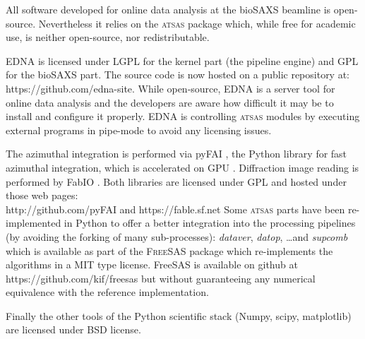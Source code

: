 \documentclass[preprint,pdf]{iucr}              %
\begin{document}
All software developed for online data analysis at the bioSAXS beamline is
open-source.
Nevertheless it relies on the \textsc{atsas} package which, while free for
academic use, is neither open-source, nor redistributable.

EDNA is licensed under LGPL for the kernel part (the pipeline engine) and GPL
for the bioSAXS part. The source code is now hosted on a public
repository at:\\https://github.com/edna-site.
While open-source, EDNA is a
server tool for online data analysis and the developers are aware how difficult
it may be to install and configure it properly. EDNA is controlling
\textsc{atsas} modules by executing external programs in pipe-mode to avoid any
licensing issues.

The azimuthal integration is performed via pyFAI \cite{pyFAI}, the Python library
for fast azimuthal integration, which is accelerated on GPU \cite{pyFAI_2015}.
Diffraction image reading is performed by FabIO \cite{fabio}.
Both libraries
are licensed under GPL and hosted under those web pages:\\
http://github.com/pyFAI and https://fable.sf.net
Some \textsc{atsas} parts have been re-implemented in Python to offer a better
integration into the processing pipelines (by avoiding the forking of many
sub-processes): \textit{dataver}, \textit{datop}, \ldots  and
\textit{supcomb} which is available as part of the \textsc{FreeSAS} package
which re-implements the algorithms in a MIT type license. FreeSAS is available
on github at https://github.com/kif/freesas but without guaranteeing any
numerical equivalence with the reference implementation.

Finally the other tools of the Python scientific stack (Numpy, scipy,
matplotlib) are licensed under BSD license.
\end{document}

